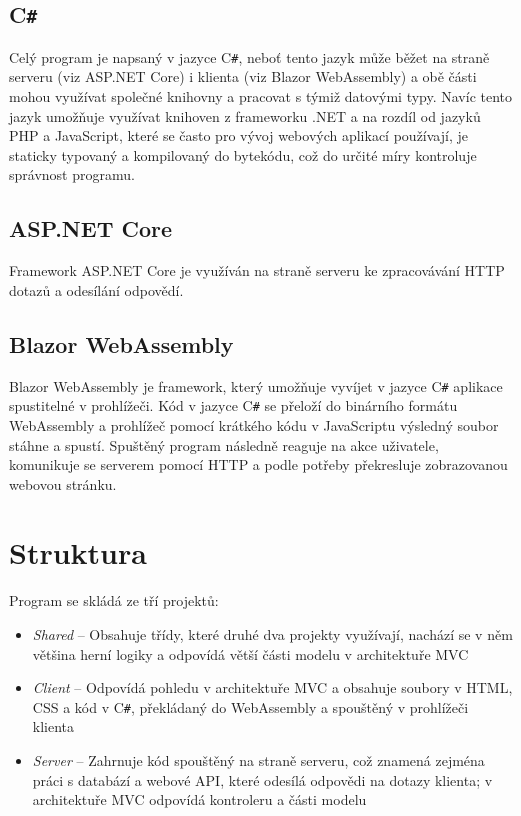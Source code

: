 \documentclass[a4paper,12pt]{article}
\def\CS{C\texttt{\#}}
\begin{document}
\subsection{\CS{}}
Celý program je napsaný v jazyce \CS{}, neboť tento jazyk může běžet na straně serveru (viz ASP.NET Core) i klienta (viz Blazor WebAssembly) a obě části mohou využívat společné knihovny a pracovat s týmiž datovými typy. Navíc tento jazyk umožňuje využívat knihoven z frameworku .NET a na rozdíl od jazyků PHP a JavaScript, které se často pro vývoj webových aplikací používají, je staticky typovaný a kompilovaný do bytekódu, což do určité míry kontroluje správnost programu.
\subsection{ASP.NET Core}
Framework ASP.NET Core je využíván na straně serveru ke zpracovávání HTTP dotazů a odesílání odpovědí.
\subsection{Blazor WebAssembly}
Blazor WebAssembly je framework, který umožňuje vyvíjet v jazyce  \CS{} aplikace spustitelné v prohlížeči. Kód v jazyce  \CS{} se přeloží do binárního formátu WebAssembly a prohlížeč pomocí krátkého kódu v JavaScriptu výsledný soubor stáhne a spustí. Spuštěný program následně reaguje na akce uživatele, komunikuje se serverem pomocí HTTP a podle potřeby překresluje zobrazovanou webovou stránku.

\section{Struktura}
Program se skládá ze tří projektů:
\begin{itemize}
\item\textit{Shared} -- Obsahuje třídy, které druhé dva projekty využívají, nachází se v něm většina herní logiky a odpovídá větší části modelu v architektuře MVC\cite{mvc}
\item\textit{Client} -- Odpovídá pohledu v architektuře MVC a obsahuje soubory v HTML, CSS a kód v  \CS{}, překládaný do WebAssembly a spouštěný v prohlížeči klienta
\item\textit{Server} -- Zahrnuje kód spouštěný na straně serveru, což znamená zejména práci s databází a webové API, které odesílá odpovědi na dotazy klienta; v architektuře MVC odpovídá kontroleru a části modelu
\end{itemize}
\newpage
\printbibliography[heading=bibintoc, title={Použitá literatura}]
\end{document}
